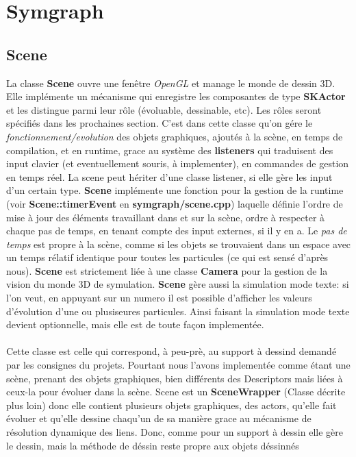 \documentclass{report}
\begin{document}
\chapter{Symgraph}

\section {Scene}

La classe \textbf{Scene} ouvre une fenêtre \textit{OpenGL} et manage le monde de dessin 3D.
Elle implémente un mécanisme qui enregistre les composantes de type \textbf{SKActor} et les distingue parmi leur rôle (évoluable, dessinable, etc).
Les rôles seront spécifiés dans les prochaines section. 
C'est dans cette classe qu'on gére le \textit{fonctionnement/evolution} des objets graphiques, ajoutés à la scène, en temps de compilation,
et en runtime, grace au système des \textbf{listeners} qui traduisent des input clavier (et eventuellement souris, à implementer), en commandes de gestion en temps réel.
La scene peut hériter d'une classe listener, si elle gère les input d'un certain type.
\textbf{Scene} implémente une fonction pour la gestion de la runtime (voir \textbf{Scene::timerEvent} en \textbf{symgraph/scene.cpp})
laquelle définie l'ordre de mise à jour des éléments travaillant dans et sur la scène, ordre à respecter à chaque pas de temps, en tenant compte des input externes, si il y en a.
Le \textit{pas de temps} est propre à la scène, comme si les objets se trouvaient dans un espace avec un temps rélatif identique pour toutes les particules (ce qui est sensé d'après nous).
\textbf{Scene} est strictement liée à une classe \textbf{Camera} pour la gestion de la vision du monde 3D de symulation.
\textbf{Scene} gère aussi la simulation mode texte: si l'on veut, en appuyant sur un numero il est possible d'afficher les valeurs d'évolution d'une ou plusiseures particules.
Ainsi faisant la simulation mode texte devient optionnelle, mais elle est de toute façon implementée.
\\
\\
Cette classe est celle qui correspond, à peu-prè, au support à dessind demandé par les consignes du projets. 
Pourtant nous l'avons implementée comme étant une scène, prenant des objets graphiques, bien différents des Descriptors mais liées à ceux-la pour évoluer dans la scène.
Scene est un \textbf{SceneWrapper} (Classe décrite plus loin) donc elle contient plusieurs objets graphiques, des actors, qu'elle fait évoluer et qu'elle dessine chaqu'un de sa manière
grace au mécanisme de résolution dynamique des liens.
Donc, comme pour un support à dessin elle gère le dessin, mais la méthode de déssin reste propre aux objets déssinnés
\end{document}
